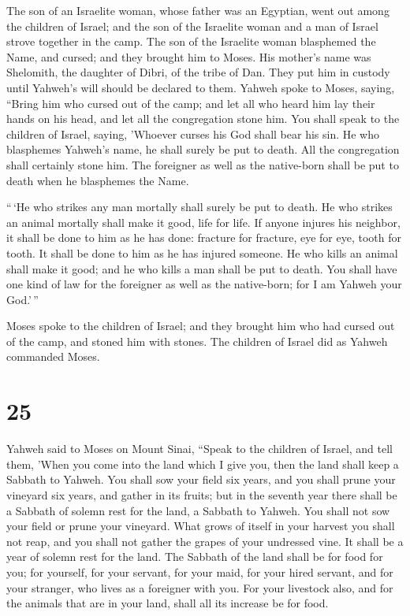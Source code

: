  The son of an Israelite woman, whose father was an
Egyptian, went out among the children of Israel; and the son of the
Israelite woman and a man of Israel strove together in the camp.
 The son of the Israelite woman blasphemed the Name, and
cursed; and they brought him to Moses. His mother's name was Shelomith,
the daughter of Dibri, of the tribe of Dan.  They put him
in custody until Yahweh's will should be declared to them.
 Yahweh spoke to Moses, saying,  ``Bring
him who cursed out of the camp; and let all who heard him lay their
hands on his head, and let all the congregation stone him.
 You shall speak to the children of Israel, saying,
'Whoever curses his God shall bear his sin.  He who
blasphemes Yahweh's name, he shall surely be put to death. All the
congregation shall certainly stone him. The foreigner as well as the
native-born shall be put to death when he blasphemes the Name.

 ``\,`He who strikes any man mortally shall surely be put
to death.  He who strikes an animal mortally shall make
it good, life for life.  If anyone injures his neighbor,
it shall be done to him as he has done:  fracture for
fracture, eye for eye, tooth for tooth. It shall be done to him as he
has injured someone.  He who kills an animal shall make
it good; and he who kills a man shall be put to death. 
You shall have one kind of law for the foreigner as well as the
native-born; for I am Yahweh your God.'\,''

 Moses spoke to the children of Israel; and they brought
him who had cursed out of the camp, and stoned him with stones. The
children of Israel did as Yahweh commanded Moses.

\hypertarget{section-24}{%
\section{25}\label{section-24}}

 Yahweh said to Moses on Mount Sinai, 
``Speak to the children of Israel, and tell them, 'When you come into
the land which I give you, then the land shall keep a Sabbath to Yahweh.
 You shall sow your field six years, and you shall prune
your vineyard six years, and gather in its fruits;  but in
the seventh year there shall be a Sabbath of solemn rest for the land, a
Sabbath to Yahweh. You shall not sow your field or prune your vineyard.
 What grows of itself in your harvest you shall not reap,
and you shall not gather the grapes of your undressed vine. It shall be
a year of solemn rest for the land.  The Sabbath of the
land shall be for food for you; for yourself, for your servant, for your
maid, for your hired servant, and for your stranger, who lives as a
foreigner with you.  For your livestock also, and for the
animals that are in your land, shall all its increase be for food.

